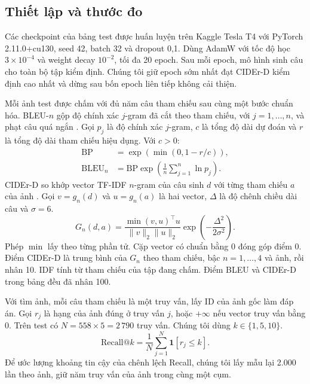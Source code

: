 \subsection{Thiết lập và thước đo}

Các checkpoint của bảng test được huấn luyện trên Kaggle Tesla T4 với PyTorch 2.11.0+cu130, seed 42, batch 32 và dropout 0,1. Dùng AdamW với tốc độ học $3\times10^{-4}$ và weight decay $10^{-2}$, tối đa 20 epoch. Sau mỗi epoch, mô hình sinh câu cho toàn bộ tập kiểm định. Chúng tôi giữ epoch sớm nhất đạt CIDEr-D kiểm định cao nhất và dừng sau bốn epoch liên tiếp không cải thiện.

Mỗi ảnh test được chấm với đủ năm câu tham chiếu sau cùng một bước chuẩn hóa. BLEU-$n$ gộp độ chính xác $j$-gram đã cắt theo tham chiếu, với $j=1,\ldots,n$, và phạt câu quá ngắn \citep{papineni2002bleu}. Gọi $p_j$ là độ chính xác $j$-gram, $c$ là tổng độ dài dự đoán và $r$ là tổng độ dài tham chiếu hiệu dụng. Với $c>0$:
\begin{align}
  \mathrm{BP}&=\exp\!\left(\min(0,1-r/c)\right),\\
  \mathrm{BLEU}_n&=\mathrm{BP}\exp\!\left(
                  \frac1n\sum_{j=1}^{n}\ln p_j\right).
\end{align}
CIDEr-D so khớp vector TF-IDF $n$-gram của câu sinh $d$ với từng tham chiếu $a$ của ảnh \citep{vedantam2015cider}. Gọi $v=g_n(d)$ và $u=g_n(a)$ là hai vector, $\Delta$ là độ chênh chiều dài câu và $\sigma=6$.
\begin{equation}
  G_n(d,a)=
  \frac{\min(v,u)^\top u}{\lVert v\rVert_2\lVert u\rVert_2}
  \exp\!\left(-\frac{\Delta^2}{2\sigma^2}\right).
  \label{eq:cider}
\end{equation}
Phép $\min$ lấy theo từng phần tử. Cặp vector có chuẩn bằng 0 đóng góp điểm 0. Điểm CIDEr-D là trung bình của $G_n$ theo tham chiếu, bậc $n=1,\ldots,4$ và ảnh, rồi nhân 10. IDF tính từ tham chiếu của tập đang chấm. Điểm BLEU và CIDEr-D trong bảng đều đã nhân 100.

Với tìm ảnh, mỗi câu tham chiếu là một truy vấn, lấy ID của ảnh gốc làm đáp án. Gọi $r_j$ là hạng của ảnh đúng ở truy vấn $j$, hoặc $+\infty$ nếu vector truy vấn bằng 0. Trên test có $N=558\times5=2\,790$ truy vấn. Chúng tôi dùng $k\in\{1,5,10\}$.
\begin{equation}
  \mathrm{Recall@}k=\frac{1}{N}
    \sum_{j=1}^{N}\mathbf 1[r_j\le k].
  \label{eq:recall}
\end{equation}
Để ước lượng khoảng tin cậy của chênh lệch Recall, chúng tôi lấy mẫu lại 2.000 lần theo ảnh, giữ năm truy vấn của ảnh trong cùng một cụm.

